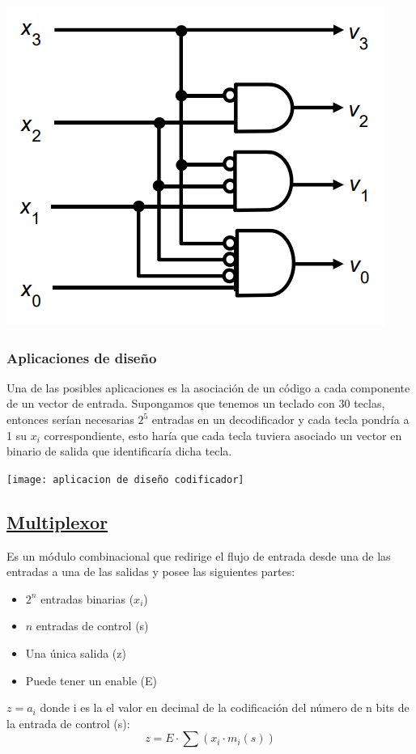 \documentclass[a4paper,10pt]{book}
\begin{document}
\begin{center}
\includegraphics[scale=0.60]{resolutor de prioridades tripas}
\end{center}

\subsubsection*{Aplicaciones de diseño}
Una de las posibles aplicaciones es la asociación de un código a cada componente de un vector de entrada. Supongamos que tenemos un teclado con 30 teclas, entonces serían necesarias $2^5$ entradas en un decodificador y cada tecla pondría a 1 su $x_i$ correspondiente, esto haría que cada tecla tuviera asociado un vector en binario de salida que identificaría dicha tecla.

\begin{center}
\texttt{[image: aplicacion de diseño codificador]}
\end{center}


\subsection*{\underline{Multiplexor}}
Es un módulo combinacional que redirige el flujo de entrada desde una de las entradas a una de las salidas y posee las siguientes partes:
\begin{itemize}
\item $2^n$ entradas binarias ($x_i$)
\item $n$ entradas de control (s)
\item Una única salida (z)
\item Puede tener un enable (E)
\end{itemize}
$z=a_i$ donde i es la el valor en decimal de la codificación del número de n bits de la entrada de control (s):
$$z=E\cdot \sum (x_i\cdot m_i(s))$$
\end{document}
